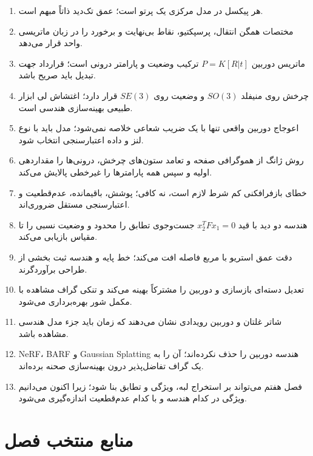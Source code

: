 \documentclass[12pt,openany,oneside]{book}
\begin{document}
\begin{summarybox}
\begin{enumerate}
\item هر پیکسل در مدل مرکزی یک پرتو است؛ عمق تک‌دید ذاتاً مبهم است.
\item مختصات همگن انتقال، پرسپکتیو، نقاط بی‌نهایت و برخورد را در زبان ماتریسی واحد قرار می‌دهد.
\item ماتریس دوربین \(P=K[R|t]\) ترکیب وضعیت و پارامتر درونی است؛ قرارداد جهت تبدیل باید صریح باشد.
\item چرخش روی منیفلد \(SO(3)\) و وضعیت روی \(SE(3)\) قرار دارد؛ اغتشاش لی ابزار طبیعی بهینه‌سازی هندسی است.
\item اعوجاج دوربین واقعی تنها با یک ضریب شعاعی خلاصه نمی‌شود؛ مدل باید با نوع لنز و داده اعتبارسنجی انتخاب شود.
\item روش ژانگ از هموگرافی صفحه و تعامد ستون‌های چرخش، درونی‌ها را مقداردهی اولیه و سپس همه پارامترها را غیرخطی پالایش می‌کند.
\item خطای بازفرافکنی کم شرط لازم است، نه کافی؛ پوشش، باقیمانده، عدم‌قطعیت و اعتبارسنجی مستقل ضروری‌اند.
\item هندسه دو دید با قید \(x_2^TFx_1=0\) جست‌وجوی تطابق را محدود و وضعیت نسبی را تا مقیاس بازیابی می‌کند.
\item دقت عمق استریو با مربع فاصله افت می‌کند؛ خط پایه و هندسه ثبت بخشی از طراحی برآوردگرند.
\item تعدیل دسته‌ای بازسازی و دوربین را مشترکاً بهینه می‌کند و تنکی گراف مشاهده با مکمل شور بهره‌برداری می‌شود.
\item شاتر غلتان و دوربین رویدادی نشان می‌دهند که زمان باید جزء مدل هندسی مشاهده باشد.
\item NeRF، BARF و Gaussian Splatting هندسه دوربین را حذف نکرده‌اند؛ آن را به یک گراف تفاضل‌پذیر درون بهینه‌سازی صحنه برده‌اند.
\item فصل هفتم می‌تواند بر استخراج لبه، ویژگی و تطابق بنا شود؛ زیرا اکنون می‌دانیم ویژگی در کدام هندسه و با کدام عدم‌قطعیت اندازه‌گیری می‌شود.
\end{enumerate}
\end{summarybox}

\backmatter
\chapter*{منابع منتخب فصل}
\end{document}
